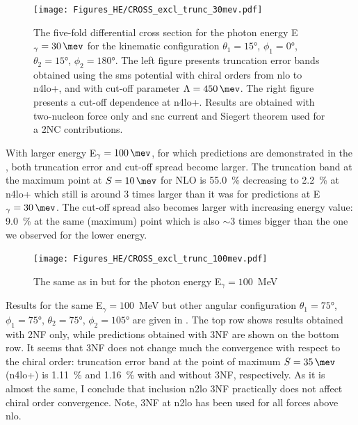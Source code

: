     \begin{figure}[h]
        \begin{center}
            \texttt{[image: Figures\_HE/CROSS\_excl\_trunc\_30mev.pdf]}
            \end{center}
            \caption{The five-fold differential cross section for the photon 
            energy E$_\gamma=\SI{30}{\mev}$ for the kinematic configuration
            $\theta_1 = \ang{15}$, $\phi_1 = \ang{0}$,
            $\theta_2 = \ang{15}$, $\phi_2 = \ang{180}$.
            The left figure presents truncation error bands obtained using the \gls{sms} potential
            with chiral orders from \gls{nlo} to \gls{n4lo+}, and with
            cut-off parameter $\Lambda=\SI{450}{\mev}$.
            The right figure presents a cut-off dependence at \gls{n4lo+}.
            Results are obtained with two-nucleon force only and \gls{snc} current
            and Siegert theorem used for a 2NC contributions.}
            \label{CROSS_HE_EXCL_30}
        \end{figure}

    With larger energy E$_\gamma=\SI{100}{\mev}$, for which predictions
    are demonstrated in the ,
    both truncation error and cut-off spread become larger.
    The truncation band at the maximum point at $S=\SI{10}{\mev}$ for NLO is \SI{55.0}{\percent}
    decreasing to \SI{2.2}{\percent} at \gls{n4lo+} which still is around 3 times larger than
    it was for predictions at E$_\gamma=\SI{30}{\mev}$.
    The cut-off spread also becomes larger with increasing energy value: \SI{9.0}{\percent}
    at the same (maximum) point which is also $\sim 3$ times bigger than the one we observed
    for the lower energy.

        \begin{figure}[h]
            \begin{center}
            \texttt{[image: Figures\_HE/CROSS\_excl\_trunc\_100mev.pdf]}
            \end{center}
            \caption{The same as in  but 
            for the photon energy E$_\gamma=100$~MeV}
            \label{CROSS_HE_EXCL_100}
        \end{figure}

    Results for the same E$_\gamma=100$~MeV but other angular configuration  
    $\theta_1 = \ang{75}$, $\phi_1 = \ang{75}$,
    $\theta_2 = \ang{75}$, $\phi_2 = \ang{105}$ are
    given in .
    The top row shows results obtained with 2NF only, while predictions obtained with 3NF are shown
    on the bottom row.
    It seems that 3NF does not change much the convergence with respect to the chiral order:
    truncation error band at the point of maximum $S=\SI{35}{\mev}$ (\gls{n4lo+})
    is \SI{1.11}{\percent} and \SI{1.16}{\percent} with and without 3NF, respectively.
    As it is almost the same, I conclude that inclusion \gls{n2lo} 3NF practically
    does not affect chiral order convergence.
    Note, 3NF at \gls{n2lo} has been used for all forces above \gls{nlo}.


